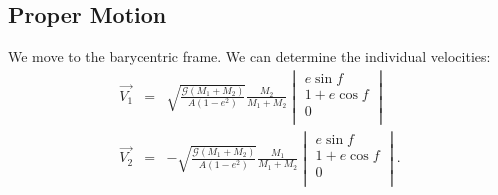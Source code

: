 \documentclass{emulateapj}
\begin{document}
\subsection{Proper Motion}

We move to the barycentric frame. We can determine the individual velocities:
\begin{eqnarray}
\vec{V_1} &=& \sqrt{\frac{\mathcal{G} (M_1 + M_2) }{A (1-e^2)}} \frac{M_2}{M_1 + M_2}
  \begin{vmatrix}
     e \sin f \\
    1 + e \cos f \\
    0 \\        
  \end{vmatrix} \\
\vec{V_2} &=& -\sqrt{\frac{\mathcal{G} (M_1 + M_2) }{A (1-e^2)}} \frac{M_1}{M_1 + M_2}
  \begin{vmatrix}
     e \sin f \\
    1 + e \cos f \\
    0 \\        
  \end{vmatrix}.
\end{eqnarray}
\end{document}
